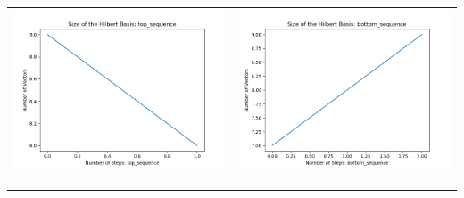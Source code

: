 \documentclass[10pt]{article}
\begin{document}
\begin{tabular}{c|c}
\begin{minipage}{.45\textwidth}
\includegraphics[width=\textwidth]{"DATA/5d/6 generators 1 bound A/top_sequence SIZE"}
\end{minipage} &
\begin{minipage}{.45\textwidth}
\includegraphics[width=\textwidth]{"DATA/5d/6 generators 1 bound A bottomup/bottom_sequence SIZE"}
\end{minipage} \\ \\
\hline \\\begin{minipage}{.45\textwidth}

\end{minipage}
\end{tabular}
\end{document}
